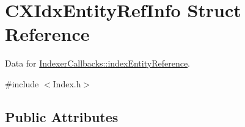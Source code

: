 \hypertarget{structCXIdxEntityRefInfo}{}\section{C\+X\+Idx\+Entity\+Ref\+Info Struct Reference}
\label{structCXIdxEntityRefInfo}


Data for \mbox{\hyperlink{structIndexerCallbacks_a6d93809e7743a590beafa0387ac145dc}{Indexer\+Callbacks\+::index\+Entity\+Reference}}.  




{\ttfamily \#include $<$Index.\+h$>$}

\subsection*{Public Attributes}
